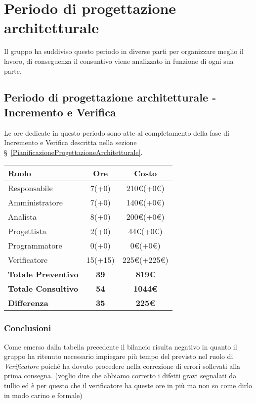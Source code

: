 {{\section{Periodo di progettazione architetturale}\label{ConsuntivoPeriodoDiProgettazioneArchitetturale}

Il gruppo ha suddiviso questo periodo in diverse parti per organizzare meglio il lavoro, di conseguenza il consuntivo viene analizzato in funzione di ogni sua parte.

\subsection{Periodo di progettazione architetturale - Incremento e Verifica}\label{ConsuntivoPeriodoDiProgettazioneArchitetturaleIncrementoEVerifica}

Le ore dedicate in questo periodo sono atte al completamento della fase di Incremento e Verifica descritta nella sezione \S~\ref{PianificazioneProgettazioneArchitetturale}.

\quad
\def\tabularxcolumn#1{m{#1}}
{
	\begin{center}
		\renewcommand{\arraystretch}{1.4}
		\begin{tabularx}{10cm}{|X|c|c|}
			\hline
			\rowcolor{airforceblue}
			\textbf{Ruolo} & \textbf{Ore} & \textbf{Costo}\\
			\hline
			Responsabile & 7(+0) & 210\euro(+0\euro)\\
			\hline
			Amministratore & 7(+0) & 140\euro(+0\euro)\\
			\hline
			Analista & 8(+0) & 200\euro(+0\euro)\\
			\hline
			Progettista & 2(+0) & 44\euro(+0\euro)\\
			\hline
			Programmatore & 0(+0) & 0\euro(+0\euro)\\
			\hline
			Verificatore & 15(+15) & 225\euro(+225\euro)\\
			\hline
			\textbf{Totale Preventivo} & \textbf{39} & \textbf{819\euro}\\
			\hline
			\textbf{Totale Consultivo} & \textbf{54} & \textbf{1044\euro}\\
			\hline
			\textbf{Differenza} & \textbf{35} & \textbf{225\euro}
		\end{tabularx}
	\end{center}

\subsubsection{Conclusioni}
Come emerso dalla tabella precedente il bilancio risulta negativo in quanto il gruppo ha ritenuto necessario impiegare più tempo del previsto nel ruolo di \textit{Verificatore} poiché ha dovuto procedere nella correzione di errori sollevati alla prima consegna. (voglio dire che abbiamo corretto i difetti gravi segnalati da tullio ed è per questo che il verificatore ha queste ore in più ma non so come dirlo in modo carino e formale)

}}}
